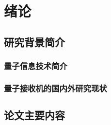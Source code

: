 \chapter{绪论}
\section{研究背景简介}

\subsection{量子信息技术简介}

\subsection{量子接收机的国内外研究现状}




\section{论文主要内容}
